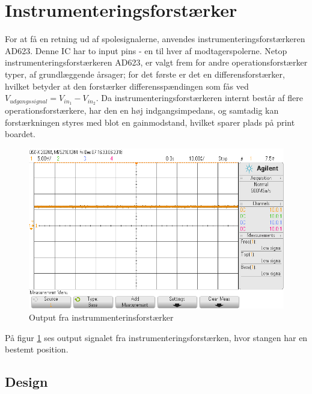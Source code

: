\section{Instrumenteringsforstærker}\label{sec:summa}
For at få en retning ud af spolesignalerne, anvendes instrumenteringsforstærkeren AD623. Denne IC har to input pins - en til hver af modtagerspolerne.
Netop instrumenteringsforstærkeren AD623, er valgt frem for andre operationsforstærker typer, af grundlæggende årsager; for det første er det en differensforstærker, hvilket betyder at den forstærker differensspændingen som fås ved $V_{udgangssignal} = V_{in_1} - V_{in_2}$. Da instrumenteringsforstærkeren internt består af flere operationsforstærkere, har den en høj indgangsimpedans, og samtadig kan forstærkningen styres med blot en gainmodstand, hvilket sparer plads på print boardet.

\begin{figure}[h!]
	\centering
	\includegraphics[width=1\textwidth]{billeder/instr_png.png}
	\caption{Output fra instrummenterinsforstærker}
	\label{fig:filter_out}
\end{figure}
På figur \ref{fig:filter_out} ses output signalet fra instrumenteringsforstærken, hvor stangen har en bestemt position.
\subsection{Design}

